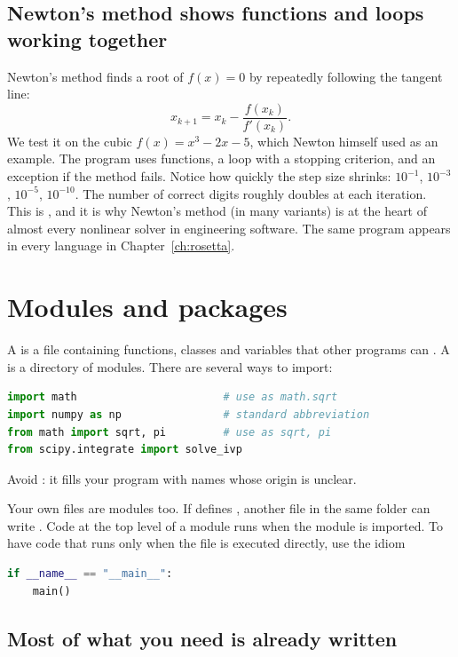 \subsection*{Newton's method shows functions and loops working together}

Newton's method finds a root of $f(x) = 0$ by repeatedly following the tangent line:
\[
x_{k+1} = x_k - \frac{f(x_k)}{f'(x_k)}.
\]
We test it on the cubic $f(x) = x^3 - 2x - 5$, which Newton himself used as an example. The
program uses functions, a loop with a stopping criterion, and an exception if the method
fails.
Notice how quickly the step size shrinks: $10^{-1}$, $10^{-3}$, $10^{-5}$, $10^{-10}$.
The number of correct digits roughly doubles at each iteration. This is , and it is why Newton's method (in many variants) is at the heart of almost
every nonlinear solver in engineering software. The same program appears in every language
in Chapter~\ref{ch:rosetta}.

\section{Modules and packages}

A  is a  file containing functions, classes and variables that
other programs can . A  is a directory of modules. There are
several ways to import:
\begin{lstlisting}[language=Python]
import math                       # use as math.sqrt
import numpy as np                # standard abbreviation
from math import sqrt, pi         # use as sqrt, pi
from scipy.integrate import solve_ivp
\end{lstlisting}
Avoid : it fills your program with names whose origin is
unclear.

Your own files are modules too. If  defines , another file
in the same folder can write . Code at the top level of a
module runs when the module is imported. To have code that runs only when the file is
executed directly, use the idiom
\begin{lstlisting}[language=Python]
if __name__ == "__main__":
    main()
\end{lstlisting}

\subsection*{Most of what you need is already written}

